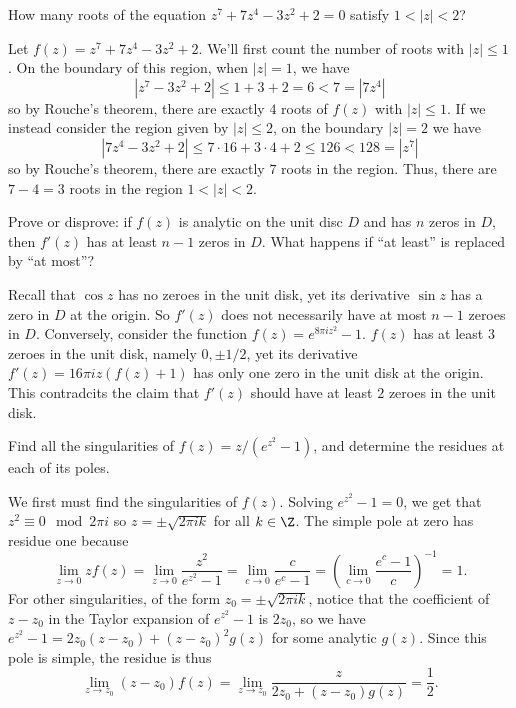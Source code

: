 \documentclass[11pt,letterpaper]{article}
\begin{document}
\begin{problem}
    How many roots of the equation $z^7+7z^4-3z^2+2=0$ satisfy $1<|z|<2$?
\end{problem}

\begin{solution}
    Let $f(z)=z^7+7z^4-3z^2+2$. We'll first count the number of roots with $|z|\leq 1$. On the boundary of this region, when $|z|=1$, we have
    \[
        |z^7-3z^2+2|\leq 1+3+2= 6 < 7 = |7z^4|
    \]
    so by Rouche's theorem, there are exactly $4$ roots of $f(z)$ with $|z|\leq 1$. If we instead consider the region given by $|z|\leq 2$, on the boundary $|z|=2$ we have
    \[
        |7z^4-3z^2+2|\leq 7\cdot 16 + 3\cdot 4 + 2\leq 126 < 128 = |z^7|
    \]
    so by Rouche's theorem, there are exactly $7$ roots in the region. Thus, there are $7-4=3$ roots in the region $1<|z|<2$.
\end{solution}

\begin{problem}
    Prove or disprove: if $f(z)$ is analytic on the unit disc $D$ and has $n$ zeros in $D$, then $f'(z)$ has at least $n-1$ zeros in $D$. What happens if ``at least'' is replaced by ``at most''?
\end{problem}

\begin{solution}
    Recall that $\cos z$ has no zeroes in the unit disk, yet its derivative $\sin z$ has a zero in $D$ at the origin. So $f'(z)$ does not necessarily have at most $n-1$ zeroes in $D$. Conversely, consider the function $f(z)=e^{8\pi i z^2}-1$. $f(z)$ has at least $3$ zeroes in the unit disk, namely $0,\pm 1/2$, yet its derivative $f'(z)=16\pi i z (f(z)+1)$ has only one zero in the unit disk at the origin. This contradcits the claim that $f'(z)$ should have at least $2$ zeroes in the unit disk.
\end{solution}

\begin{problem}
    Find all the singularities of $f(z)=z/(e^{z^2}-1)$, and determine the residues at each of its poles.
\end{problem}

\begin{solution}
    We first must find the singularities of $f(z)$. Solving $e^{z^2}-1=0$, we get that $z^2\equiv 0 \mod 2\pi i$ so $z = \pm \sqrt{2\pi i k}$ for all $k\in \Z$. The simple pole at zero has residue one because
    \[
        \lim_{z \to 0} zf(z) = \lim_{z\to 0} \frac{z^2}{e^{z^2}-1} = \lim_{c\to 0} \frac{c}{e^c-1} = \left(\lim_{c\to 0} \frac{e^c-1}{c}\right)^{-1} = 1
    .\] 
    For other singularities, of the form $z_0=\pm \sqrt{2\pi i k}$, notice that the coefficient of $z-z_0$ in the Taylor expansion of $e^{z^2}-1$ is $2z_0$, so we have $e^{z^2}-1=2z_0(z-z_0)+(z-z_0)^2g(z)$ for some analytic $g(z)$. Since this pole is simple, the residue is thus
    \[
        \lim_{z\to z_0} (z-z_0)f(z)=\lim_{z\to z_0}\frac{z}{2z_0+(z-z_0)g(z)} = \frac{1}{2}
    .\] 
\end{solution}
\end{document}

